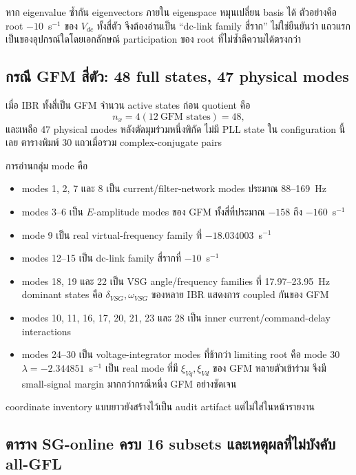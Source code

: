 \documentclass[12pt,a4paper]{article}
\begin{document}
หาก eigenvalue ซ้ำกัน eigenvectors ภายใน eigenspace หมุนเปลี่ยน basis ได้ ตัวอย่างคือ root
$-10$~s$^{-1}$ ของ $V_{dc}$ ทั้งสี่ตัว จึงต้องอ่านเป็น ``dc-link family สี่ราก'' ไม่ใช่ยืนยันว่า
แถวแรกเป็นของอุปกรณ์ใดโดยเอกลักษณ์ participation ของ root ที่ไม่ซ้ำตีความได้ตรงกว่า

\subsection{กรณี GFM สี่ตัว: 48 full states, 47 physical modes}

เมื่อ IBR ทั้งสี่เป็น GFM จำนวน active states ก่อน quotient คือ
\begin{equation}
n_x=4(12\ \text{GFM states})=48,
\end{equation}
และเหลือ 47 physical modes หลังตัดมุมร่วมหนึ่งพิกัด ไม่มี PLL state ใน configuration นี้เลย
ตารางพิมพ์ 30 แถวเมื่อรวม complex-conjugate pairs



การอ่านกลุ่ม mode คือ
\begin{itemize}
\item modes 1, 2, 7 และ 8 เป็น current/filter-network modes ประมาณ 88--169~Hz
\item modes 3--6 เป็น $E$-amplitude modes ของ GFM ทั้งสี่ที่ประมาณ $-158$ ถึง $-160$~s$^{-1}$
\item mode 9 เป็น real virtual-frequency family ที่ $-18.034003$~s$^{-1}$
\item modes 12--15 เป็น dc-link family สี่รากที่ $-10$~s$^{-1}$
\item modes 18, 19 และ 22 เป็น VSG angle/frequency families ที่ 17.97--23.95~Hz
dominant states คือ $\delta_{VSG},\omega_{VSG}$ ของหลาย IBR แสดงการ coupled กันของ GFM
\item modes 10, 11, 16, 17, 20, 21, 23 และ 28 เป็น inner current/command-delay interactions
\item modes 24--30 เป็น voltage-integrator modes ที่ช้ากว่า limiting root คือ mode 30
$\lambda=-2.344851$~s$^{-1}$ เป็น real mode ที่มี $\xi_{Vq},\xi_{Vd}$ ของ GFM หลายตัวเข้าร่วม
จึงมี small-signal margin มากกว่ากรณีหนึ่ง GFM อย่างชัดเจน
\end{itemize}

coordinate inventory แบบยาวยังสร้างไว้เป็น audit artifact แต่ไม่ใส่ในหน้ารายงาน

\subsection{ตาราง SG-online ครบ 16 subsets และเหตุผลที่ไม่บังคับ all-GFL}
\end{document}
